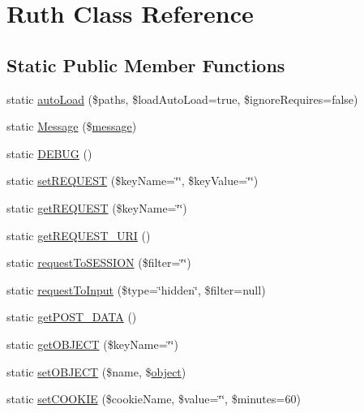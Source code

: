 \hypertarget{classRuth}{}\section{Ruth Class Reference}
\label{classRuth}
\subsection*{Static Public Member Functions}
\begin{DoxyCompactItemize}
\item 
static \hyperlink{classRuth_a0d04b422b261fcbf033abfe6b77d5a2d}{auto\+Load} (\$paths, \$load\+Auto\+Load=true, \$ignore\+Requires=false)
\item 
static \hyperlink{classRuth_a6322471f9832f6b0c92e8d321956874c}{Message} (\$\hyperlink{Tessa_8php_a37ab31c170417027f819bfc053d7cd39}{message})
\item 
static \hyperlink{classRuth_aa0e8f0a163756675b0ec431bb7dd0b49}{D\+E\+B\+U\+G} ()
\item 
static \hyperlink{classRuth_a0fc75ae6b986d7109f66f659cf1dcac2}{set\+R\+E\+Q\+U\+E\+S\+T} (\$key\+Name=\char`\"{}\char`\"{}, \$key\+Value=\char`\"{}\char`\"{})
\item 
static \hyperlink{classRuth_abe809de9dafced3724124f3399af01f3}{get\+R\+E\+Q\+U\+E\+S\+T} (\$key\+Name=\char`\"{}\char`\"{})
\item 
static \hyperlink{classRuth_a0a05421198533990654d0c1fb0beaffd}{get\+R\+E\+Q\+U\+E\+S\+T\+\_\+\+U\+R\+I} ()
\item 
static \hyperlink{classRuth_a627fd70f5f186ba0d4d3dc187a432b81}{request\+To\+S\+E\+S\+S\+I\+O\+N} (\$filter=\char`\"{}\char`\"{})
\item 
static \hyperlink{classRuth_ae10d9c25d1910e59a15662dd1304c23b}{request\+To\+Input} (\$type=\char`\"{}hidden\char`\"{}, \$filter=null)
\item 
static \hyperlink{classRuth_addbd05bd71b3abeff8e8250c46897e5b}{get\+P\+O\+S\+T\+\_\+\+D\+A\+T\+A} ()
\item 
static \hyperlink{classRuth_a899c68457a6a7c1b8a0b25bfd74c4c15}{get\+O\+B\+J\+E\+C\+T} (\$key\+Name=\char`\"{}\char`\"{})
\item 
static \hyperlink{classRuth_a9d554d9bdfe7596d41a2b08a3c0db9ce}{set\+O\+B\+J\+E\+C\+T} (\$name, \$\hyperlink{Shape_8php_a774642dc290de09e3aff55c8b594113f}{object})
\item 
static \hyperlink{classRuth_a971920e4c13f4e16bc8d72379804c16f}{set\+C\+O\+O\+K\+I\+E} (\$cookie\+Name, \$value=\char`\"{}\char`\"{}, \$minutes=60)

\end{DoxyCompactItemize}
